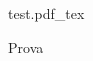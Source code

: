 \documentclass[../template.tex]{subfiles}
\begin{document}
\begin{figure}[h!]\centering
    {test.pdf_tex}
    \caption{Prova}
\end{figure}
\end{document}
